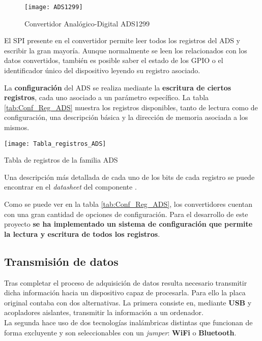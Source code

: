 \begin{figure} [h]
    \centering
    \texttt{[image: ADS1299]}
    \caption{Convertidor Analógico-Digital ADS1299}
    \label{fig:ADS1299}
\end{figure}

El \acrshort{SPI} presente en el convertidor permite leer todos los registros del ADS y escribir la gran mayoría. Aunque normalmente se leen los relacionados con los datos convertidos, también es posible saber el estado de los \acrshort{GPIO} o el identificador único del dispositivo leyendo su registro asociado.

La \textbf{configuración} del ADS se realiza mediante la \textbf{escritura de ciertos registros}, cada uno asociado a un parámetro específico. La tabla \ref{tab:Conf_Reg_ADS} muestra los registros disponibles, tanto de lectura como de configuración, una descripción básica y la dirección de memoria asociada a los mismos.

\begin{table} [h]
    \centering
    \texttt{[image: Tabla\_registros\_ADS]}
    \caption{Tabla de registros de la familia ADS \cite{Datasheet_ADS}}
    \label{tab:Conf_Reg_ADS}
\end{table}

Una descripción más detallada de cada uno de los bits de cada registro se puede encontrar en el \textit{datasheet} del componente \cite{Datasheet_ADS}.

Como se puede ver en la tabla \ref{tab:Conf_Reg_ADS}, los convertidores cuentan con una gran cantidad de opciones de configuración. Para el desarrollo de este proyecto \textbf{se ha implementado un sistema de configuración que permite la lectura y escritura de todos los registros}.

\subsection{Transmisión de datos\label{sec:Transmisión_N}}

Tras completar el proceso de adquisición de datos resulta necesario transmitir dicha información hacia un dispositivo capaz de procesarla. Para ello la placa original contaba con dos alternativas. La primera consiste en, mediante \textbf{\acrshort{USB}} y acopladores aislantes, transmitir la información a un ordenador. 
\\La segunda hace uso de dos tecnologías inalámbricas distintas que funcionan de forma excluyente y son seleccionables con un \textit{jumper}: \textbf{WiFi} o \textbf{Bluetooth}.

